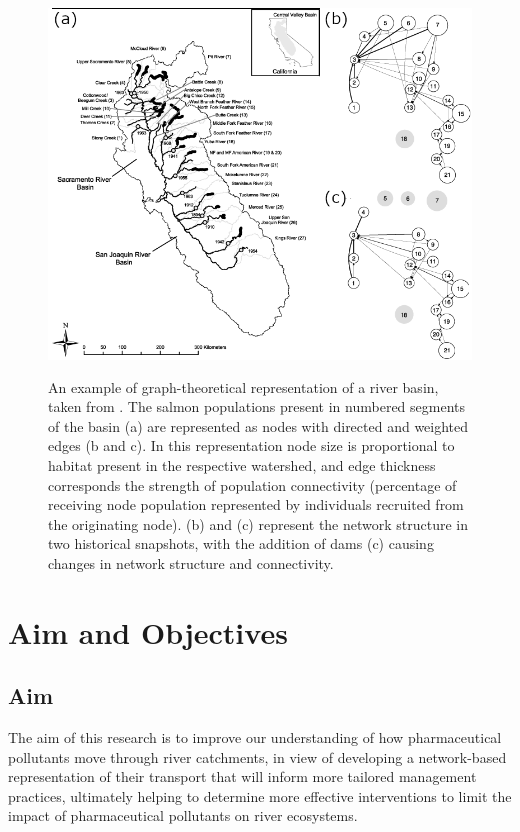 \documentclass{article}
\begin{document}
\begin{figure}
    \centering
    \includegraphics[height=10cm]{fig_graph_schick.png}
    \caption{An example of graph-theoretical representation of a river basin, taken from \citet{Schick2007DirectedNetwork}. The salmon populations present in numbered segments of the basin (a) are represented as nodes with directed and weighted edges (b and c). In this representation node size is proportional to habitat present in the respective watershed, and edge thickness corresponds the strength of population connectivity (percentage of receiving node population represented by individuals recruited from the originating node). (b) and (c) represent the network structure in two historical snapshots, with the addition of dams (c) causing changes in network structure and connectivity.}
    \label{fig_graph_schick}
\end{figure}

\clearpage
\section{Aim and Objectives}
\subsection{Aim}
The aim of this research is to improve our understanding of how pharmaceutical pollutants move through river catchments, in view of developing a network-based representation of their transport that will inform more tailored management practices, ultimately helping to determine more effective interventions to limit the impact of pharmaceutical pollutants on river ecosystems. 
\end{document}
